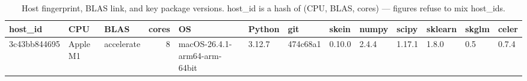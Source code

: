 \begin{table}[t]
  \centering
  \caption{Host fingerprint, BLAS link, and key package versions. host_id is a hash of (CPU, BLAS, cores) — figures refuse to mix host_ids.}
  \label{tab:environment}
\begin{tabular}{lllrlllllllll}
\toprule
host_id & CPU & BLAS & cores & OS & Python & git & skein & numpy & scipy & sklearn & skglm & celer \\
\midrule
3c43bb844695 & Apple M1 & accelerate & 8 & macOS-26.4.1-arm64-arm-64bit & 3.12.7 & 474c68a1 & 0.10.0 & 2.4.4 & 1.17.1 & 1.8.0 & 0.5 & 0.7.4 \\
\bottomrule
\end{tabular}
\end{table}
